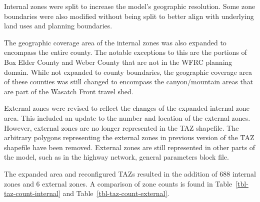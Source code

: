 \documentclass[
  letterpaper,
  DIV=11,
  numbers=noendperiod]{scrreprt}
\begin{document}
Internal zones were split to increase the model's geographic resolution.
Some zone boundaries were also modified without being split to better
align with underlying land uses and planning boundaries.

The geographic coverage area of the internal zones was also expanded to
encompass the entire county. The notable exceptions to this are the
portions of Box Elder County and Weber County that are not in the WFRC
planning domain. While not expanded to county boundaries, the geographic
coverage area of these counties was still changed to encompass the
canyon/mountain areas that are part of the Wasatch Front travel shed.

External zones were revised to reflect the changes of the expanded
internal zone area. This included an update to the number and location
of the external zones. However, external zones are no longer represented
in the TAZ shapefile. The arbitrary polygons representing the external
zones in previous version of the TAZ shapefile have been removed.
External zones are still represented in other parts of the model, such
as in the highway network, general parameters block file.

The expanded area and reconfigured TAZs resulted in the addition of 688
internal zones and 6 external zones. A comparison of zone counts is
found in Table~\ref{tbl-taz-count-internal} and
Table~\ref{tbl-taz-count-external}.
\end{document}
